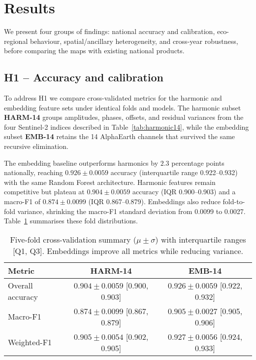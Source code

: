 \documentclass[utf8]{FrontiersinHarvard}
\begin{document}
\section{Results}
\label{sec:results}
We present four groups of findings: national accuracy and calibration, eco-regional behaviour, spatial/ancillary heterogeneity, and cross-year robustness, before comparing the maps with existing national products.
\subsection{H1 -- Accuracy and calibration}
To address H1 we compare cross-validated metrics for the harmonic and embedding feature sets under identical folds and models. The harmonic subset \textbf{HARM-14} groups amplitudes, phases, offsets, and residual variances from the four Sentinel-2 indices described in Table~\ref{tab:harmonic14}, while the embedding subset \textbf{EMB-14} retains the 14 AlphaEarth channels that survived the same recursive elimination.

The embedding baseline outperforms harmonics by \(2.3\) percentage points nationally, reaching \(0.926 \pm 0.0059\) accuracy (interquartile range 0.922–0.932) with the same Random Forest architecture. Harmonic features remain competitive but plateau at \(0.904 \pm 0.0059\) accuracy (IQR 0.900–0.903) and a macro-F1 of \(0.874 \pm 0.0099\) (IQR 0.867–0.879). Embeddings also reduce fold-to-fold variance, shrinking the macro-F1 standard deviation from 0.0099 to 0.0027. Table~\ref{tab:cv_summary} summarises these fold distributions.
\begin{table}[H]
    \centering
    \small
    \begin{tabular}{lcc}
        \toprule
        \textbf{Metric} & \textbf{HARM-14} & \textbf{EMB-14} \\
        \midrule
        Overall accuracy & \(0.904 \pm 0.0059\) [0.900, 0.903] & \(0.926 \pm 0.0059\) [0.922, 0.932] \\
        Macro-F1 & \(0.874 \pm 0.0099\) [0.867, 0.879] & \(0.905 \pm 0.0027\) [0.905, 0.906] \\
        Weighted-F1 & \(0.905 \pm 0.0054\) [0.902, 0.905] & \(0.927 \pm 0.0056\) [0.924, 0.933] \\
        \bottomrule
    \end{tabular}
    \caption{Five-fold cross-validation summary (\( \mu \pm \sigma\)) with interquartile ranges [Q1, Q3]. Embeddings improve all metrics while reducing variance.}
    \label{tab:cv_summary}
\end{table}
\end{document}
